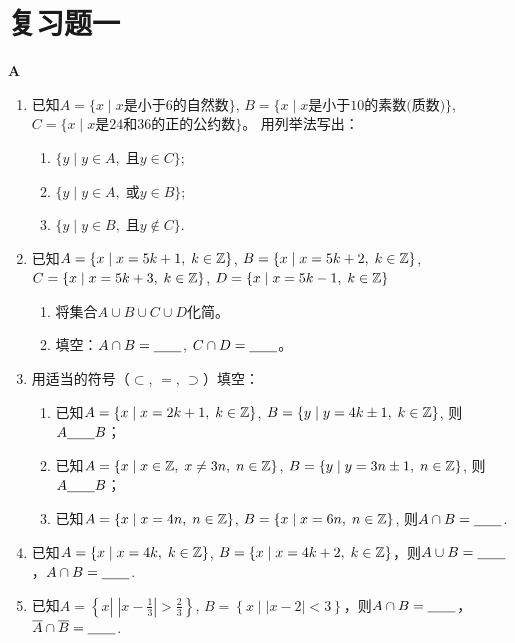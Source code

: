 \section*{复习题一}
\begin{center}
    \bfseries A
\end{center}

\begin{enumerate}
    \item 已知$A=\{x\mid x\text{是小于6的自然数}\}$, 
    $B=\{x\mid x\text{是小于10的素数(质数)}\}$,  $C=\{x\mid x\text{是24和36的正的公约数}\}$。
    用列举法写出： 
\begin{enumerate}[(1)]
    \item $\{y\mid y\in A,\;\text{且} y\in C\}$;
    \item $\{y\mid y\in A,\;\text{或} y\in B\}$;
    \item $\{y\mid y\in B,\; \text{且}y\notin C\}$.
\end{enumerate}
  \item 已知$A=\{x\mid x=5k+1,\; k\in \mathbb{Z}\}$, $B=\{x\mid x=5k+2,\; k\in \mathbb{Z}\}$, $C=\{x\mid x=5k+3,\; k\in \mathbb{Z}\}$, $D=\{x\mid x=5k-1,\; k\in \mathbb{Z}\}$
  \begin{enumerate}[(1)]
    \item 将集合$A\cup B\cup C\cup D$化简。
    \item 填空：$A\cap B=\underline{\qquad}$, $C\cap D=\underline{\qquad}$。
  \end{enumerate}

\item  用适当的符号（$\subset$, $=$, $\supset$）填空：
\begin{enumerate}[(1)]
    \item 已知$A=\{x\mid x=2k+1,\; k\in \mathbb{Z}\}$, $B=\{y\mid y=4k\pm 1,\; k\in \mathbb{Z}\}$, 则$A\underline{\qquad} B$；
    \item 已知$A=\{x\mid x\in\mathbb{Z},\; x\ne 3n,\; n\in \mathbb{Z}\}$, $B=\{y\mid y=3n\pm 1,\; n\in \mathbb{Z}\}$, 则$A\underline{\qquad} B$；
    \item 已知$A=\{x\mid x=4n,\; n\in \mathbb{Z}\}$, $B=\{x\mid x=6n,\; n\in \mathbb{Z}\}$, 则$A\cap B=\underline{\qquad} $.
\end{enumerate}

\item 已知$A=\{x\mid x=4k,\; k\in \mathbb{Z}\}$, $B=\{x\mid x=4k+2,\; k\in \mathbb{Z}\}$，则$A\cup B=\underline{\qquad}$，$A\cap B=\underline{\qquad}$.

\item 已知$A=\left\{x\left|\; \left|x-\frac{1}{3}\right|>\frac{2}{3}\right.\right\}$, $B=\left\{x\mid |x-2|<3\right\}$，则$A\cap B=\underline{\qquad}$，$\overline{A}\cap \overline{B}=\underline{\qquad}$.


\end{enumerate}
